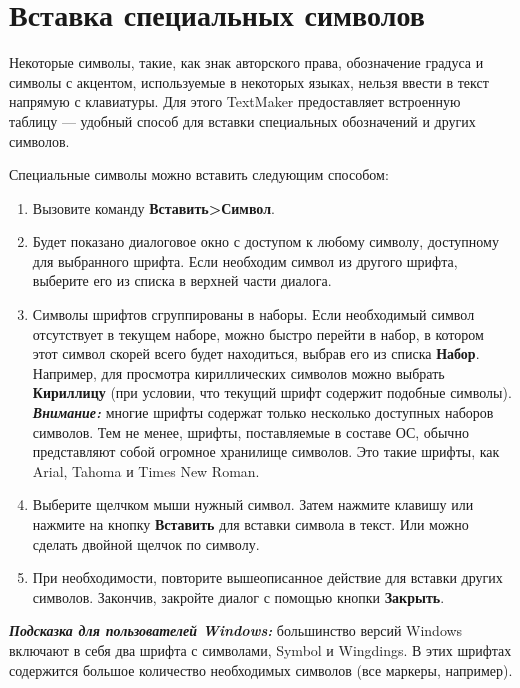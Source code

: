 \documentclass[a4paper,10pt]{article}
\begin{document}
\section{Вставка специальных символов}
Некоторые символы, такие, как знак авторского права, обозначение градуса и символы с акцентом, используемые в некоторых языках, нельзя ввести в текст напрямую с клавиатуры. Для этого TextMaker предоставляет встроенную таблицу --- удобный способ для вставки специальных обозначений и других символов.

Специальные символы можно вставить следующим способом:
\begin{enumerate}
 \item Вызовите команду \textbf{Вставить>Символ}.
 \item Будет показано диалоговое окно с доступом к любому символу, доступному для выбранного шрифта. Если необходим символ из другого шрифта, выберите его из списка в верхней части диалога.
 \item Символы шрифтов сгруппированы в наборы. Если необходимый символ отсутствует в текущем наборе, можно быстро перейти в набор, в котором этот символ скорей всего будет находиться, выбрав его из списка \textbf{Набор}. Например, для просмотра кириллических символов можно выбрать \textbf{Кириллицу} (при условии, что текущий шрифт содержит подобные символы).\\
 \textit{\textbf{Внимание:}} многие шрифты содержат только несколько доступных наборов символов. Тем не менее, шрифты, поставляемые в составе ОС, обычно представляют собой огромное хранилище символов. Это такие шрифты, как Arial, Tahoma и Times New Roman.
 \item Выберите щелчком мыши нужный символ. Затем нажмите клавишу  или нажмите на кнопку \textbf{Вставить} для вставки символа в текст. Или можно сделать двойной щелчок по символу. 
 \item При необходимости, повторите вышеописанное действие для вставки других символов. Закончив, закройте диалог с помощью кнопки \textbf{Закрыть}.
\end{enumerate}

\begin{mdframed}[backgroundcolor=blue!10]
\textbf{\textit{Подсказка для пользователей Windows:}} большинство версий Windows включают в себя два шрифта с символами, Symbol и Wingdings. В этих шрифтах содержится большое количество необходимых символов (все маркеры, например).
\end{mdframed}
\end{document}
